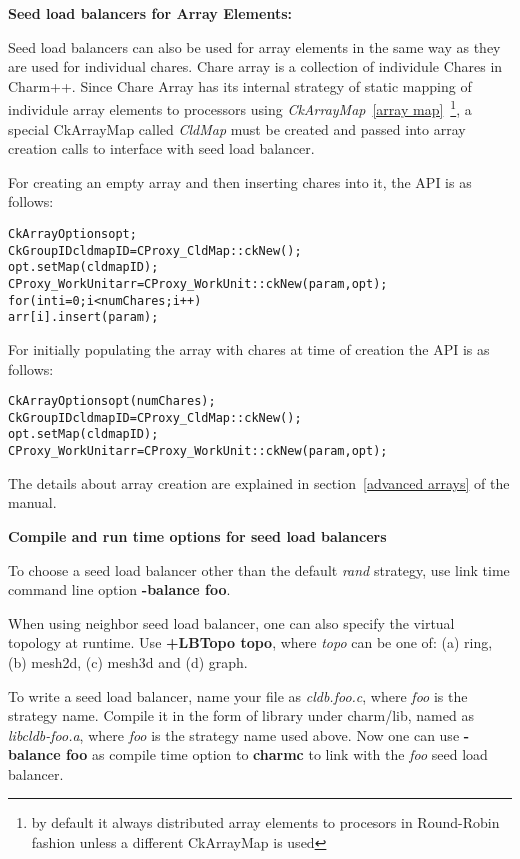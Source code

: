 {\bf Seed load balancers for Array Elements:}

Seed load balancers can also be used for array elements in the same way 
as they are used for individual chares.
Chare array is a collection of individule Chares in Charm++.
Since Chare Array has its internal strategy of static mapping of individule
array elements to processors using {\em CkArrayMap}~\ref{array map}~\footnote{by default it always distributed array elements to procesors in Round-Robin fashion unless a different CkArrayMap is used}, 
a special CkArrayMap called {\em CldMap} must be created and passed into
array creation calls to interface with seed load balancer.

For creating an empty array and then inserting chares into it, the API is as follows:

\begin{alltt}
  CkArrayOptions opt;
  CkGroupID cldmapID = CProxy_CldMap::ckNew();
  opt.setMap(cldmapID);
  CProxy_WorkUnit arr = CProxy_WorkUnit::ckNew(param, opt); 
  for (int i=0; i<numChares; i++) 
    arr[i].insert(param);
\end{alltt}

For initially populating the array with chares at time of creation the API is as follows:
\begin{alltt}
  CkArrayOptions opt(numChares);
  CkGroupID cldmapID = CProxy_CldMap::ckNew();
  opt.setMap(cldmapID);
  CProxy_WorkUnit arr = CProxy_WorkUnit::ckNew(param, opt); 
\end{alltt}

The details about array creation are explained in section~\ref{advanced arrays} of the manual.

{\bf Compile and run time options for seed load balancers}

To choose a seed load balancer other than the default {\em rand} strategy,
use link time command line option {\bf -balance foo}. 

When using {\rm neighbor} seed load balancer, one can also specify
the virtual topology at runtime. Use {\bf +LBTopo topo}, where {\em topo}
can be one of: (a) ring, (b) mesh2d, (c) mesh3d and (d) graph.

To write a seed load balancer, name your file as {\em cldb.foo.c},
where {\em foo} is the strategy name.  Compile it in the form of library
under charm/lib, named as {\em libcldb-foo.a}, where {\em foo} is the strategy 
name used above. Now one can use {\bf -balance foo} as compile time option
to {\bf charmc} to link with the {\em foo} seed load balancer.
